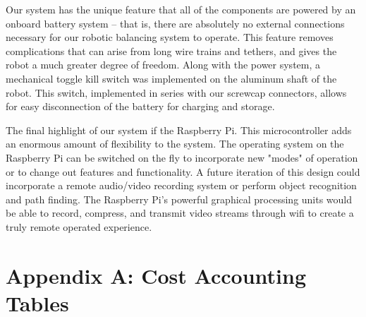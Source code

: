 \documentclass[11pt]{report}
\begin{document}
\begin{spacing}{1.5}
Our system has the unique feature that all of the components are powered by an onboard battery system – that is, there are absolutely no external connections necessary for our robotic balancing system to operate. This feature removes complications that can arise from long wire trains and tethers, and gives the robot a much greater degree of freedom. Along with the power system, a mechanical toggle kill switch was implemented on the aluminum shaft of the robot. This switch, implemented in series with our screwcap connectors, allows for easy disconnection of the battery for charging and storage.

The final highlight of our system if the Raspberry Pi.  This microcontroller adds an enormous amount of flexibility to the system.  The operating system on the Raspberry Pi can be switched on the fly to incorporate new "modes" of operation or to change out features and functionality.  A future iteration of this design could incorporate a remote audio/video recording system or perform object recognition and path finding.  The Raspberry Pi's powerful graphical processing units would be able to record, compress, and transmit video streams through wifi to create a truly remote operated experience.

{}

\clearpage

\section*{Appendix A: Cost Accounting Tables}


\end{spacing}
\end{document}
